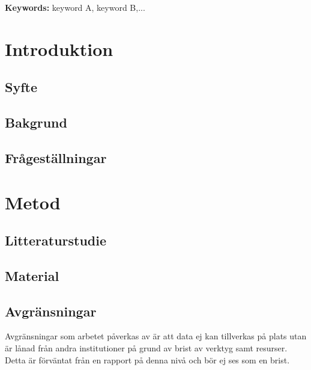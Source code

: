 \documentclass[a4paper,margin=3.25cm]{article}
\begin{document}


    \clearpage\thispagestyle{empty}\addtocounter{page}{-1}

	



	\begin{abstract}
%
		\lipsum[1-2]
	\end{abstract}

	\begin{flushleft}
		{\small {\bf Keywords:} keyword A, keyword B,...}
	\end{flushleft}


	\tableofcontents

	\clearpage

	\section{Introduktion}
	\subsection{Syfte}

	\subsection{Bakgrund}

	\subsection{Frågeställningar}
		\lipsum[3-4]
	\section{Metod}%

\subsection{Litteraturstudie}

	\subsection{Material}
	\subsection{Avgränsningar}
Avgränsningar som arbetet påverkas av är att data ej kan tillverkas på plats utan
är lånad från andra institutioner på grund av brist av verktyg samt resurser.
Detta är förväntat från en rapport på denna nivå och bör ej ses som en brist.
\end{document}
